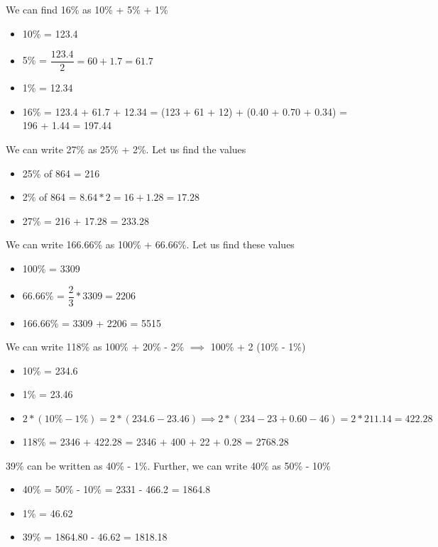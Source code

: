 We can find 16\% as 10\% + 5\% + 1\%
\begin{itemize}
    \item 10\% = 123.4
    \item 5\% = $\dfrac{123.4}{2} = 60 + 1.7 = 61.7$
    \item 1\% = 12.34
    \item 16\% = 123.4 + 61.7 + 12.34 = (123 + 61 + 12) + (0.40 + 0.70 + 0.34) = 196 + 1.44 = 197.44
\end{itemize}

We can write 27\% as 25\% + 2\%. Let us find the values
\begin{itemize}
    \item 25\% of 864 = 216
    \item 2\% of 864 = $8.64 * 2 = 16 + 1.28 = 17.28$
    \item 27\% = 216 + 17.28 = 233.28
\end{itemize}

We can write 166.66\% as 100\% + 66.66\%. Let us find these values
\begin{itemize}
    \item 100\% = 3309
    \item 66.66\% = $\dfrac{2}{3} * 3309 = 2206$
    \item 166.66\% = 3309 + 2206 = 5515
\end{itemize}

We can write 118\% as 100\% + 20\% - 2\% $\implies$ 100\% + 2 (10\% - 1\%)
\begin{itemize}
    \item 10\% = 234.6
    \item 1\% = 23.46
    \item $2 * (10\% - 1\%) = 2 * (234.6 - 23.46) \implies 2 * (234 - 23 + 0.60 - 46) = 2 * 211.14 = 422.28$
    \item 118\% = 2346 + 422.28 = 2346 + 400 + 22 + 0.28 = 2768.28
\end{itemize}

39\% can be written as 40\% - 1\%. Further, we can write 40\% as 50\% - 10\%
\begin{itemize}
    \item 40\% = 50\% - 10\% = 2331 - 466.2 = 1864.8
    \item 1\% = 46.62
    \item 39\% = 1864.80 - 46.62 = 1818.18
\end{itemize}

